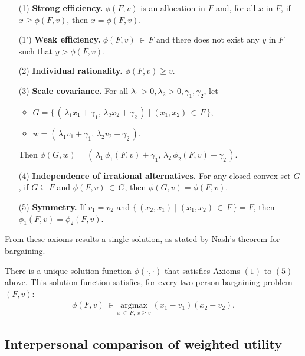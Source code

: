 \begin{enumerate}

	\item[(1)\phantom{'}] \textbf{Strong efficiency.} $\phi(F, v)$ is an allocation in $F$ and, for all $x$ in $F$, if $x \geq \phi(F, v)$, then $x = \phi(F, v)$.
	\item[(1')] \textbf{Weak efficiency.} $\phi(F, v) \, \in \, F$ and there does not exist any $y$ in $F$ such that $y > \phi(F, v)$.
	\item[(2)\phantom{'}] \textbf{Individual rationality.} $\phi(F, v) \geq v$.
	\item[(3)\phantom{'}] \textbf{Scale covariance.} For all $\lambda_1 > 0, \lambda_2 > 0, \gamma_1, \gamma_2$, let
	\begin{itemize}
		\item $G = \{ \, ( \, \lambda_1 x_1 + \gamma_1, \, \lambda_2 x_2 + \gamma_2 \, ) \; | \; (x_1, x_2) \, \in \, F \, \}$,
		\item $w = ( \, \lambda_1 v_1 + \gamma_1, \, \lambda_2 v_2 + \gamma_2 \, )$.
	\end{itemize}
	Then $\phi(G, w) = ( \, \lambda_1 \,  \phi_1(F, v) + \gamma_1, \,  \lambda_2 \,  \phi_2(F, v) + \gamma_2 \, )$.
	\item[(4)\phantom{'}] \textbf{Independence of irrational alternatives.} For any closed convex set $G$, if $G \subseteq F$ and $\phi(F, v) \, \in \, G$, then $\phi(G, v) = \phi(F, v)$.
	\item[(5)\phantom{'}] \textbf{Symmetry.} If $v_1 = v_2$ and $\{ \, (x_2, x_1) \; | \; (x_1, x_2) \, \in \, F \, \} = F$, then $\phi_1(F, v) = \phi_2(F, v)$.
	
\end{enumerate}

From these axioms results a single solution, as stated by Nash's theorem for bargaining.

\begin{theorem}
There is a unique solution function $\phi(\cdot, \cdot)$ that satisfies Axioms $(1)$ to $(5)$ above. This solution function satisfies, for every two-person bargaining problem $(F, v)$:
\begin{align} \label{thm1}
	\phi(F, v) \, \in \, \underset{x \, \in \, F, \, x \geq v}{\mathrm{argmax}} \ (x_1 - v_1)(x_2 - v_2).
\end{align}
\end{theorem}



\subsection{Interpersonal comparison of weighted utility} \label{sec:egalitarian-utilitarian}



